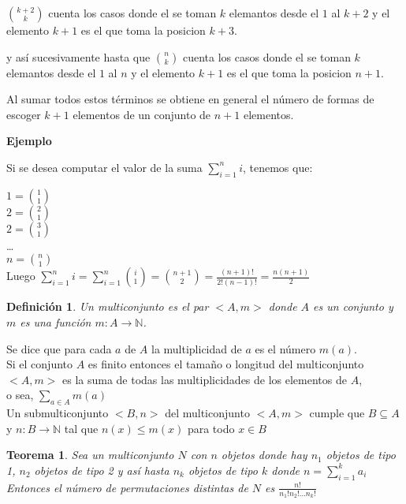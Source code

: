 \documentclass[a4paper,12pt]{report}
\newtheorem*{teo}{Teorema}
\newtheorem*{dfn}{Definición}
\begin{document}
\begin{enumerate}
 ${k+2}\choose{k}$ cuenta los casos donde el se toman $k$ elemantos desde el $1$ al $k+2$ y el elemento $k+1$ es el que toma la posicion $k+3$.

 y as\'i sucesivamente hasta que  ${n}\choose{k}$ cuenta los casos donde el se toman $k$ elemantos desde el $1$ al $n$ y el elemento $k+1$ es el que toma la posicion $n+1$.

 Al sumar todos estos t\'erminos se obtiene en general el n\'umero de formas de escoger $k+1$ elementos de un conjunto de $n+1$ elementos.

\end{enumerate}

\textbf{Ejemplo}

Si se desea computar el valor de la suma $\sum_{i=1}^{n} i$, tenemos que:

$1 =$${1}\choose{1}$\\

$2=$${2}\choose{1}$\\

$2=$${3}\choose{1}$\\

\dots\\

$n=$${n}\choose{1}$\\

Luego $\sum_{i=1}^{n} i = \sum_{i=1}^{n}$${i}\choose{1}$$=$${n+1}\choose{2}$$= \frac{(n+1)!}{2!(n-1)!} = \frac{n(n+1)}{2}$


\begin{dfn}
 Un multiconjunto es el  par $<A,m>$ donde $A$ es un conjunto y $m$ es una función $m:A\rightarrow \mathbb{N}$. 
\end{dfn}

Se dice que para cada $a$ de $A$ la multiplicidad de $a$ es el número $m(a)$.\\

Si el conjunto $A$ es finito entonces el tamaño o longitud del multiconjunto $<A,m>$ es la suma de todas las multiplicidades de los elementos de $A$,\\ o sea, $\sum_{a\in A}m(a)$\\

Un submulticonjunto $<B,n>$ del multiconjunto $<A,m>$ cumple que $B\subseteq A$ y $n:B\rightarrow \mathbb{N}$ tal que $n(x)\leq m(x)$ para todo $x\in B$ 

\begin{teo}
 Sea un multiconjunto $N$ con $n$ objetos donde hay $n_1$ objetos de tipo 1, $n_2$ objetos de tipo 2 y así hasta $n_k$ objetos de tipo $k$ donde $n=\sum^k_{i=1}a_i$\\
 Entonces el número de permutaciones distintas de $N$ es $\frac{n!}{n_1! n_2! \dots n_k!}$
\end{teo}
\end{document}
